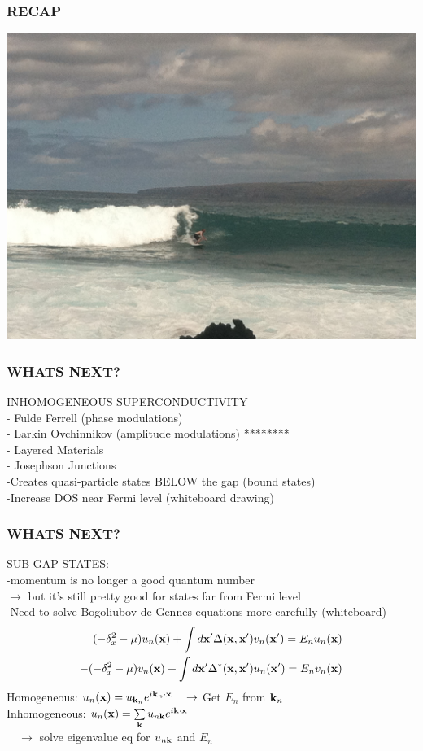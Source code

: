 \documentclass{beamer}
\newcommand\vk{\bold{k}}
\newcommand\vx{\bold{x}}
\begin{document}
\begin{frame} \frametitle{RECAP}
\includegraphics[scale=0.1]{surfing.JPG}
\end{frame}

\begin{frame} \frametitle{WHATS NEXT?}
INHOMOGENEOUS SUPERCONDUCTIVITY \\
- Fulde Ferrell (phase modulations) \\
- Larkin Ovchinnikov (amplitude modulations) ******** \\
- Layered Materials \\
- Josephson Junctions \\
\vspace{1cm}
-Creates quasi-particle states BELOW the gap (bound states) \\
-Increase DOS near Fermi level (whiteboard drawing)
\end{frame}

\begin{frame} \frametitle{WHATS NEXT?}
SUB-GAP STATES: \\
-momentum is no longer a good quantum number \\
 $\rightarrow$ but it's still pretty good for states far from Fermi level \\
-Need to solve Bogoliubov-de Gennes equations more carefully (whiteboard) \\
\begin{eqnarray}
 (-\delta^2_x - \mu) u_n(\vx) + \int d\vx' \Delta(\vx,\vx')v_n(\vx') = E_n u_n(\vx) \\
 -(-\delta^2_x - \mu) v_n(\vx) + \int d\vx' \Delta^*(\vx,\vx')u_n(\vx') = E_n v_n(\vx)
\end{eqnarray}
 Homogeneous: $u_n(\vx) = u_{\vk_n}e^{i\vk_n\cdot\vx}\quad \rightarrow$ Get $E_n$ from $\vk_n$  \\
 Inhomogeneous: $u_n(\vx) = \sum\limits_{\vk} u_{n\vk}e^{i\vk\cdot\vx}$ \\
 $\quad \rightarrow$ solve eigenvalue eq  for $u_{n\vk}$ and $E_n$\\
\end{frame}
\end{document}
